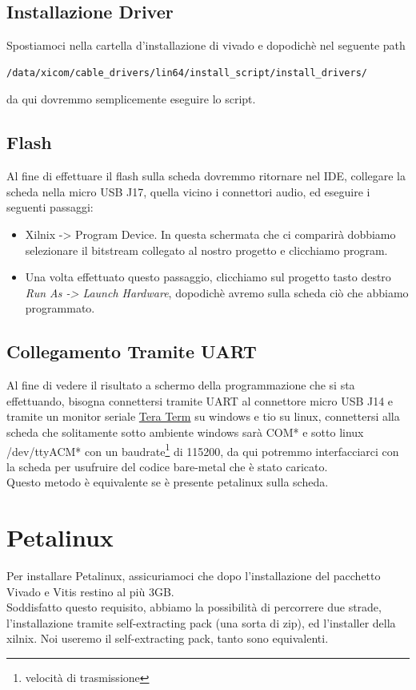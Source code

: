 \subsection{Installazione Driver}
Spostiamoci nella cartella d'installazione di vivado e dopodichè nel seguente path
\begin{lstlisting}
/data/xicom/cable_drivers/lin64/install_script/install_drivers/
\end{lstlisting}
da qui dovremmo semplicemente eseguire lo script.
\subsection{Flash}
Al fine di effettuare il flash sulla scheda dovremmo ritornare nel IDE, collegare la scheda nella micro USB J17, quella vicino i connettori audio, ed eseguire i seguenti passaggi:
\begin{itemize}
    \item Xilnix -> Program Device. In questa schermata che ci comparirà dobbiamo selezionare il bitstream collegato al nostro progetto e clicchiamo program.
    \item Una volta effettuato questo passaggio, clicchiamo sul progetto tasto destro \textit{Run As -> Launch Hardware}, dopodichè avremo sulla scheda ciò che abbiamo programmato.
\end{itemize}
\subsection{Collegamento Tramite UART}
Al fine di vedere il risultato a schermo della programmazione che si sta effettuando, bisogna connettersi tramite UART al connettore micro USB J14 e tramite un monitor seriale \href{https://ttssh2.osdn.jp/index.html.en}{Tera Term} su windows e tio su linux, connettersi alla scheda che solitamente sotto ambiente windows sarà COM* e sotto linux /dev/ttyACM* con un baudrate\footnote{velocità di trasmissione} di 115200, da qui potremmo interfacciarci con la scheda per usufruire del codice bare-metal che è stato caricato. \\
Questo metodo è equivalente se è presente petalinux sulla scheda.





\section{Petalinux}
\label{petalinuxinst}
Per installare Petalinux, assicuriamoci che dopo l'installazione del pacchetto Vivado e Vitis restino al più 3GB.\\
Soddisfatto questo requisito, abbiamo la possibilità di percorrere due strade, l'installazione tramite self-extracting pack (una sorta di zip), ed l'installer della xilnix. Noi useremo il self-extracting pack, tanto sono equivalenti.\\
